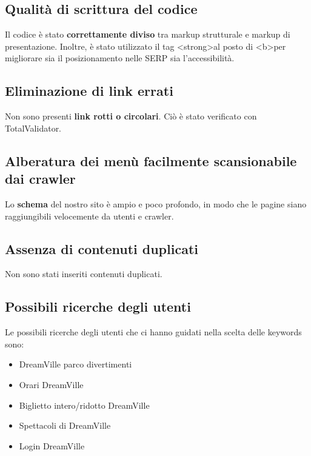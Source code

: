 \subsection{Qualità di scrittura del codice}
Il codice è stato \textbf{correttamente diviso} tra markup strutturale e markup di presentazione. Inoltre, è stato utilizzato il tag \textless strong\textgreater al posto di \textless b\textgreater per migliorare sia il posizionamento nelle SERP sia l'accessibilità.
\subsection{Eliminazione di link errati}
Non sono presenti \textbf{link rotti o circolari}. Ciò è stato verificato con TotalValidator.
\subsection{Alberatura dei menù facilmente scansionabile dai crawler}
Lo \textbf{schema} del nostro sito è ampio e poco profondo, in modo che le pagine siano raggiungibili velocemente da utenti e crawler.
\subsection{Assenza di contenuti duplicati}
Non sono stati inseriti contenuti duplicati.
\subsection{Possibili ricerche degli utenti}
Le possibili ricerche degli utenti che ci hanno guidati nella scelta delle keywords sono:
\begin{itemize}
    \item DreamVille parco divertimenti
    \item Orari DreamVille
    \item Biglietto intero/ridotto DreamVille
    \item Spettacoli di DreamVille
    \item Login DreamVille
\end{itemize}